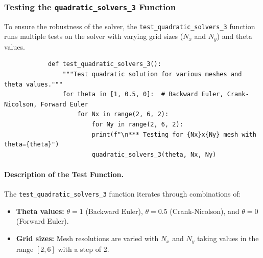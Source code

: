 \documentclass{article}
\begin{document}
		\subsubsection{Testing the \texttt{quadratic\_solvers\_3} Function}
		
		To ensure the robustness of the solver, the \texttt{test\_quadratic\_solvers\_3} function runs multiple tests on the solver with varying grid sizes (\(N_x\) and \(N_y\)) and theta values.
		
		\begin{lstlisting}
			def test_quadratic_solvers_3():
				"""Test quadratic solution for various meshes and theta values."""
				for theta in [1, 0.5, 0]:  # Backward Euler, Crank-Nicolson, Forward Euler
					for Nx in range(2, 6, 2):
						for Ny in range(2, 6, 2):
						print(f"\n*** Testing for {Nx}x{Ny} mesh with theta={theta}")
						quadratic_solvers_3(theta, Nx, Ny)
		\end{lstlisting}
		
		\paragraph{Description of the Test Function.}
		The \texttt{test\_quadratic\_solvers\_3} function iterates through combinations of:
		\begin{itemize}
			\item \textbf{Theta values:} \( \theta = 1 \) (Backward Euler), \( \theta = 0.5 \) (Crank-Nicolson), and \( \theta = 0 \) (Forward Euler).
			\item \textbf{Grid sizes:} Mesh resolutions are varied with \( N_x \) and \( N_y \) taking values in the range \( [2, 6] \) with a step of 2.
		\end{itemize}
		
\end{document}
